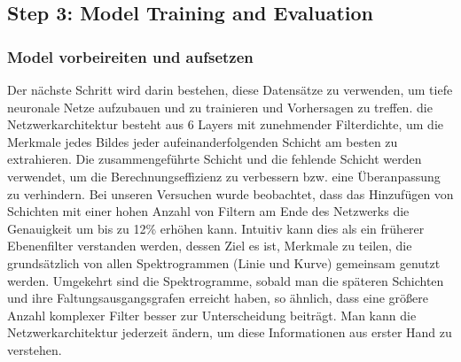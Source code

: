 \documentclass[a4paper,11pt]{article}
\theoremstyle{mytheor}
\begin{document}
\subsection{Step 3: Model Training and Evaluation}
\subsubsection{Model vorbeireiten und  aufsetzen}
Der nächste Schritt wird darin bestehen, diese Datensätze zu verwenden, um tiefe neuronale Netze aufzubauen und zu trainieren und Vorhersagen zu treffen. die Netzwerkarchitektur besteht aus 6 Layers mit zunehmender Filterdichte, um die Merkmale jedes Bildes jeder aufeinanderfolgenden Schicht am besten zu extrahieren. Die zusammengeführte Schicht und die fehlende Schicht werden verwendet, um die Berechnungseffizienz zu verbessern bzw. eine Überanpassung zu verhindern.
Bei unseren Versuchen wurde beobachtet, dass das Hinzufügen von Schichten mit einer hohen Anzahl von Filtern am Ende des Netzwerks die Genauigkeit um bis zu 12\% erhöhen kann. Intuitiv kann dies als ein früherer Ebenenfilter verstanden werden, dessen Ziel es ist, Merkmale zu teilen, die grundsätzlich von allen Spektrogrammen (Linie und Kurve) gemeinsam genutzt werden. Umgekehrt sind die Spektrogramme, sobald man die späteren Schichten und ihre Faltungsausgangsgrafen erreicht haben, so ähnlich, dass eine größere Anzahl komplexer Filter besser zur Unterscheidung beiträgt. Man kann die Netzwerkarchitektur jederzeit ändern, um diese Informationen aus erster Hand zu verstehen.\\
\end{document}
